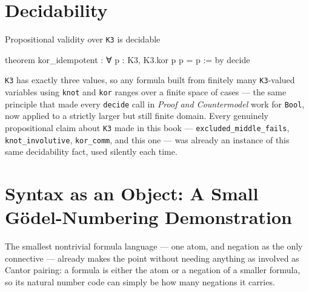 \section{Decidability}

\begin{experiment}{Propositional validity over \texttt{K3} is decidable}
\begin{lean}
theorem kor_idempotent : ∀ p : K3, K3.kor p p = p := by decide
\end{lean}
\texttt{K3} has exactly three values, so any formula built from
finitely many \texttt{K3}-valued variables using \texttt{knot} and
\texttt{kor} ranges over a finite space of cases — the same
principle that made every \texttt{decide} call in
\textit{Proof and Countermodel} work for \texttt{Bool}, now applied
to a strictly larger but still finite domain. Every genuinely
propositional claim about \texttt{K3} made in this book —
\texttt{excluded\_middle\_fails}, \texttt{knot\_involutive},
\texttt{kor\_comm}, and this one — was already an instance of this
same decidability fact, used silently each time.
\end{experiment}

\section{Syntax as an Object: A Small Gödel-Numbering Demonstration}

The smallest nontrivial formula language — one atom, and negation as
the only connective — already makes the point without needing
anything as involved as Cantor pairing: a formula is either the
atom or a negation of a smaller formula, so its natural number code
can simply be how many negations it carries.

